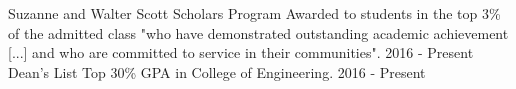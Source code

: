 \begin{cvhonors}
  \cvhonor
    {Suzanne and Walter Scott Scholars Program}
    {Awarded to students in the top 3\% of the admitted class "who have demonstrated outstanding academic achievement [...] and who are committed to service in their communities".}
    {}
    {2016 - Present}
  \cvhonor
    {Dean's List}
    {Top 30\% GPA in College of Engineering.}
    {}
    {2016 - Present}
\end{cvhonors}
